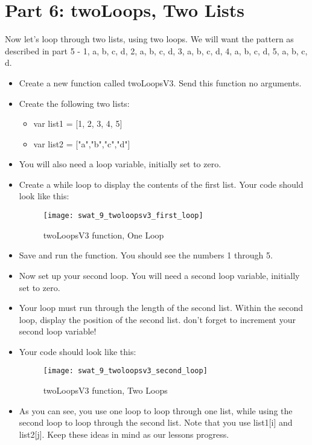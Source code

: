 \documentclass{article}
\begin{document}
\section*{Part 6: twoLoops, Two Lists}
Now let's loop through two lists, using two loops.  We will want the pattern as described in part 5 - 1, a, b, c, d, 2, a, b, c, d, 3, a, b, c, d, 4, a, b, c, d, 5, a, b, c, d.
\begin{itemize}
    \item Create a new function called twoLoopsV3. Send this function no arguments.
    \item Create the following two lists:
    \begin{itemize}
    		\item var list1 = [1, 2, 3, 4, 5]
    		\item var list2 = ["a","b","c","d"]
    	\end{itemize}
    	\item You will also need a loop variable, initially set to zero.
    	\item Create a while loop to display the contents of the first list.  Your code should look like this:
    	\begin{figure}[H]
  		\centering
  		\texttt{[image: swat\_9\_twoloopsv3\_first\_loop]}
  		\caption{twoLoopsV3 function, One Loop}
	\end{figure}
	\item Save and run the function.  You should see the numbers 1 through 5.
	\item Now set up your second loop.  You will need a second loop variable, initially set to zero.
	\item Your loop must run through the length of the second list.  Within the second loop, display the position of the second list.  don't forget to increment your second loop variable!  
	\item Your code should look like this:
	\begin{figure}[H]
  		\centering
  		\texttt{[image: swat\_9\_twoloopsv3\_second\_loop]}
  		\caption{twoLoopsV3 function, Two Loops}
	\end{figure}
	\item As you can see, you use one loop to loop through one list, while using the second loop to loop through the second list.  Note that you use list1[i] and list2[j].  Keep these ideas in mind as our lessons progress.
\end{itemize}
\end{document}
